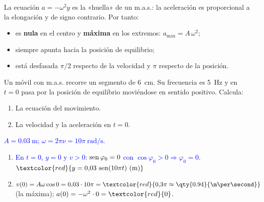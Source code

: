 La ecuación \(a = -\omega^2 y\) es la «huella» de un m.a.s.: la aceleración es proporcional a la elongación y de signo
contrario. Por tanto:
\begin{itemize}
    \item es \textbf{nula} en el centro y \textbf{máxima} en los extremos: \(a_{\text{máx}} = A\,\omega^2\);
    \item siempre apunta hacia la posición de equilibrio;
    \item está desfasada \(\pi/2\) respecto de la velocidad y \(\pi\) respecto de la posición.
\end{itemize}

\begin{exercise}
    Un móvil con m.a.s. recorre un segmento de \qty{6}{\cm}. Su frecuencia es \qty{5}{\hertz} y en \(t = 0\) pasa por la
    posición de equilibrio moviéndose en sentido positivo. Calcula:
    \begin{enumerate}[label=\letraminuscula]
        \item La ecuación del movimiento.
        \item La velocidad y la aceleración en \(t = 0\).
    \end{enumerate}
    \begin{solu}
        \textcolor{blue}{\(A = \qty{0.03}{\m}\); \(\omega = 2\pi\nu = 10\pi\ \unit{\radian\per\second}\).}
        \begin{enumerate}[label=\letraminuscula]
            \item \textcolor{blue}{En \(t = 0\), \(y = 0\) y \(v > 0\): \(\operatorname{sen}\varphi_0 = 0\) con \(\cos\varphi_0 > 0 \Rightarrow \varphi_0 = 0\).}
            \(\textcolor{red}{y = 0{,}03\,\sen(10\pi t)\ \text{(m)}}\)
            \item \(v(0) = A\omega\cos 0 = 0{,}03\cdot 10\pi = \textcolor{red}{0{,}3\pi \approx \qty{0.94}{\m\per\second}}\) (la máxima);
            \(a(0) = -\omega^2\cdot 0 = \textcolor{red}{0}\).
        \end{enumerate}
    \end{solu}
\end{exercise}

